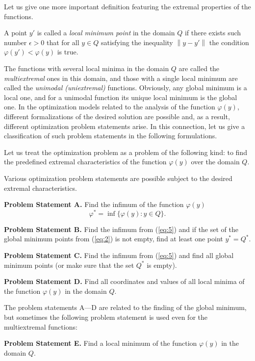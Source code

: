 Let us give one more important definition featuring the extremal properties of the functions.
\begin{definition} 
A point $y'$  is called a \textit {local minimum point} in the domain $Q$ if there exists such number $\epsilon>0$ that for all $y \in Q$ satisfying the inequality $\left\|y-y'\right\|$ the condition $\varphi(y')<\varphi(y)$ is true.
\end{definition}
The functions with several local minima in the domain $Q$ are called the \textit {multiextremal} ones in this domain, and those with a single local minimum are called the \textit {unimodal (uniextremal)} functions. Obviously, any global minimum is a local one, and for a unimodal function its unique local minimum is the global one.
In the optimization models related to the analysis of the function $\varphi(y)$, different formalizations of the desired solution are possible and, as a result, different optimization problem statements arise. In this connection, let us give a classification of such problem statements in the following formulations.
\begin{definition} 
Let us treat the optimization problem as a problem of the following kind: to find the predefined extremal characteristics of the function $\varphi(y)$ over the domain $Q$.
\end{definition}
Various optimization problem statements are possible subject to the desired extremal characteristics.

\textbf{Problem Statement A.} Find the infimum of the function $\varphi(y)$
\begin{equation}
\label{eq:5}
\varphi^*=\inf\{\varphi(y):y \in Q\}.
\end{equation}

\textbf{Problem Statement B.} Find the infimum from (\ref{eq:5}) and if the set of the global minimum points from (\ref{eq:2}) is not empty, find at least one point $y^*=Q^*$.

\textbf{Problem Statement C.} Find the infimum from (\ref{eq:5})  and find all global minimum points (or make sure that the set $Q^*$ is empty).

\textbf{Problem Statement D.} Find all coordinates and values of all local minima of the function $\varphi(y)$ in the domain $Q$.

The problem statements A—D are related to the finding of the global minimum, but sometimes the following problem statement is used even for the multiextremal functions:

\textbf{Problem Statement E.} Find a local minimum of the function $\varphi(y)$ in the domain $Q$.

